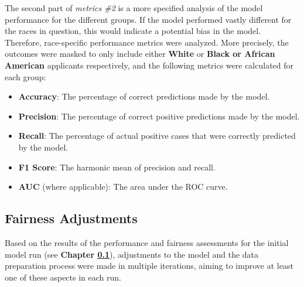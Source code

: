 The second part of \textit{metrics \#2} is a more specified analysis of the model performance for the different groups. If the model performed vastly different for the races in question, this would indicate a potential bias in the model. Therefore, race-specific performance metrics were analyzed.
More precisely, the outcomes were masked to only include either \textbf{White} or \textbf{Black or African American} applicants respectively, and the following metrics were calculated for each group:
\begin{itemize}
    \item \textbf{Accuracy}: The percentage of correct predictions made by the model.
    \item \textbf{Precision}: The percentage of correct positive predictions made by the model.
    \item \textbf{Recall}: The percentage of actual positive cases that were correctly predicted by the model.
    \item \textbf{F1 Score}: The harmonic mean of precision and recall.
    \item \textbf{AUC} (where applicable): The area under the ROC curve.
\end{itemize}


\subsection{Fairness Adjustments}\label{subsec:Iterations}


Based on the results of the performance and fairness assessments for the initial model run (see \textbf{Chapter \ref{subsec:Iterations}}), adjustments to the model and the data preparation process were made in multiple iterations, aiming to improve at least one of these aspects in each run.

